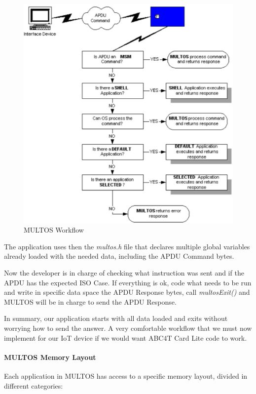 \begin{figure}[bth]
	\begin{center}
		\includegraphics[width=0.6\linewidth]{gfx/multosWorkflow}
	\end{center}
	\caption{MULTOS Workflow}
	\label{fig:multosWorkflow}
\end{figure}

The application uses then the \textit{multos.h} file that declares multiple global variables already loaded with the needed data, including the APDU Command bytes.

Now the developer is in charge of checking what instruction was sent and if the APDU has the expected ISO Case. If everything is ok, code what needs to be run and write in specific data space the APDU Response bytes, call \textit{multosExit()} and MULTOS will be in charge to send the APDU Response.

In summary, our application starts with all data loaded and exits without worrying how to send the answer. A very comfortable workflow that we must now implement for our IoT device if we would want ABC4T Card Lite code to work.

\paragraph{MULTOS Memory Layout}

Each application in MULTOS has access to a specific memory layout, divided in different categories:

